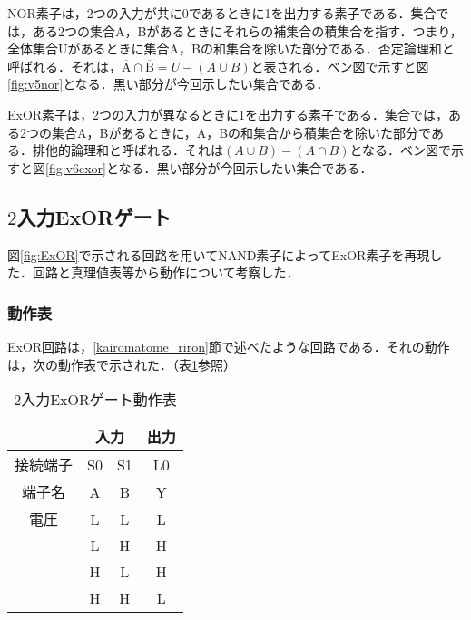 NOR素子は，2つの入力が共に0であるときに1を出力する素子である．集合では，ある2つの集合A，Bがあるときにそれらの補集合の積集合を指す．つまり，全体集合Uがあるときに集合A，Bの和集合を除いた部分である．否定論理和と呼ばれる．それは，$\overline{\mathrm{A}}\cap\overline{\mathrm{B}}=U-(A\cup B)$と表される．ベン図で示すと図\ref{fig:v5nor}となる．黒い部分が今回示したい集合である．

ExOR素子は，2つの入力が異なるときに1を出力する素子である．集合では，ある2つの集合A，Bがあるときに，A，Bの和集合から積集合を除いた部分である．排他的論理和と呼ばれる．それは$(A\cup B)-(A\cap B)$となる．ベン図で示すと図\ref{fig:v6exor}となる．黒い部分が今回示したい集合である．

%
%
%
\subsection{$2$入力ExORゲート}
\label{experiment_ExOR}
図\ref{fig:ExOR}で示される回路を用いてNAND素子によってExOR素子を再現した．回路と真理値表等から動作について考察した．

\subsubsection{動作表}
\label{ExOR_moment}
ExOR回路は，\ref{kairomatome_riron}節で述べたような回路である．それの動作は，次の動作表で示された．（表\ref{tab:exor_momenttab}参照）

\begin {table}[ht]
	\begin {center}
		\caption {2入力ExORゲート動作表}%
		\begin {tabular}{c|cc|c}\hline
			\multicolumn{1}{c|}{}&%
			\multicolumn{2}{c}{入力}&%
			\multicolumn{1}{|c}{出力}\\ %
			\hline
			\multicolumn{1}{c|}{接続端子}&%
			\multicolumn{1}{c}{S0}&%
			\multicolumn{1}{c}{S1}&%
			\multicolumn{1}{|c}{L0}\\ %
			\multicolumn{1}{c|}{端子名}&%
			\multicolumn{1}{c}{A}&%
			\multicolumn{1}{c}{B}&%
			\multicolumn{1}{|c}{Y}\\ %
			\hline
			電圧&L&L&L\\%
			&L&H&H\\%
			&H&L&H\\%
			&H&H&L\\
			\hline
		\end{tabular}
		\label {tab:exor_momenttab}%
	\end{center}
\end{table}

